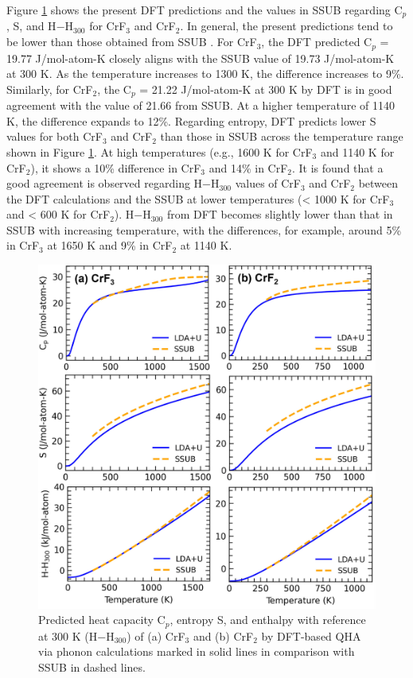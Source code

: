 Figure \ref{ms:fig:FLiNaKCr-Benchmark-Cr} shows the present DFT predictions and the values in SSUB \cite{sgteurl} regarding C$_p$, S, and H$-$H$_{300}$ for CrF$_3$ and CrF$_2$. In general, the present predictions tend to be lower than those obtained from SSUB \cite{sgteurl}. For CrF$_3$, the DFT predicted C$_p$ = 19.77 J/mol-atom-K closely aligns with the SSUB value of 19.73 J/mol-atom-K at 300 K. As the temperature increases to 1300 K, the difference increases to 9\%. Similarly, for CrF$_2$, the C$_p$ = 21.22 J/mol-atom-K at 300 K by DFT is in good agreement with the value of 21.66 from SSUB. At a higher temperature of 1140 K, the difference expands to 12\%. Regarding entropy, DFT predicts lower S values for both CrF$_3$ and CrF$_2$ than those in SSUB across the temperature range shown in Figure \ref{ms:fig:FLiNaKCr-Benchmark-Cr}. At high temperatures (e.g., 1600 K for CrF$_3$ and 1140 K for CrF$_2$), it shows a 10\% difference in CrF$_3$ and 14\% in CrF$_2$. It is found that a good agreement is observed regarding H$-$H$_{300}$ values of CrF$_3$ and CrF$_2$ between the DFT calculations and the SSUB at lower temperatures (< 1000 K for CrF$_3$ and < 600 K for CrF$_2$). H$-$H$_{300}$ from DFT becomes slightly lower than that in SSUB \cite{sgteurl} with increasing temperature, with the differences, for example, around 5\% in CrF$_3$ at 1650 K and 9\% in CrF$_2$ at 1140 K.

\begin{figure}[ht]
    \centering
    \includegraphics[width=0.75\linewidth]{moltensalts/Moltensalts-FLiNaKCr-Benchmark-Cr.jpg}
    \caption{Predicted heat capacity C$_p$, entropy S, and enthalpy with reference at 300 K (H$-$H$_{300}$) of (a) CrF$_3$ and (b) CrF$_2$ by DFT-based QHA via phonon calculations marked in solid lines in comparison with SSUB \cite{sgteurl} in dashed lines.}
    \label{ms:fig:FLiNaKCr-Benchmark-Cr}
\end{figure}

